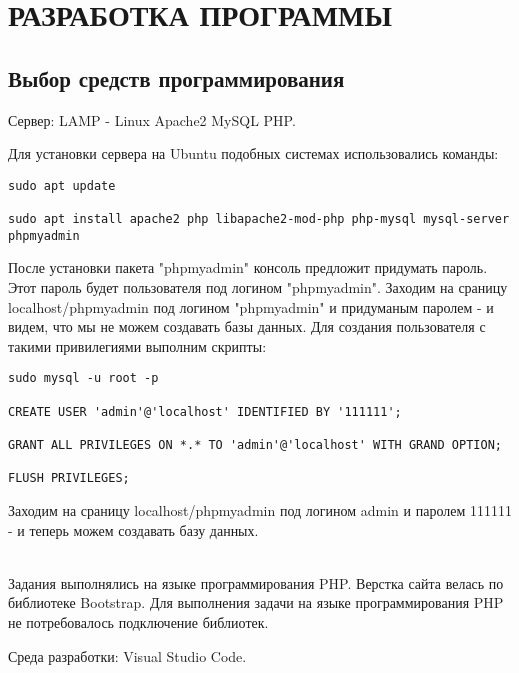 \newpage

\section{РАЗРАБОТКА ПРОГРАММЫ}

\subsection{Выбор средств программирования}

Сервер: LAMP - Linux Apache2 MySQL PHP.

Для установки сервера на Ubuntu подобных системах использовались команды:

\begin{verbatim}
sudo apt update

sudo apt install apache2 php libapache2-mod-php php-mysql mysql-server phpmyadmin
\end{verbatim}

После установки пакета "phpmyadmin" консоль предложит придумать пароль. Этот пароль будет пользователя под логином "phpmyadmin". Заходим на сраницу localhost/phpmyadmin под логином "phpmyadmin" и придуманым паролем - и видем, что мы не можем создавать базы данных. Для создания пользователя с такими привилегиями выполним скрипты:

\begin{verbatim}
sudo mysql -u root -p

CREATE USER 'admin'@'localhost' IDENTIFIED BY '111111';

GRANT ALL PRIVILEGES ON *.* TO 'admin'@'localhost' WITH GRAND OPTION;

FLUSH PRIVILEGES;
\end{verbatim}

Заходим на сраницу localhost/phpmyadmin под логином admin и паролем 111111 - и теперь можем создавать базу данных.

\hspace{0pt}\\

Задания выполнялись на языке программирования PHP. Верстка сайта велась по библиотеке Bootstrap. Для выполнения задачи на языке программирования PHP не потребовалось подключение библиотек. 

\hspace{0pt}

Среда разработки: Visual Studio Code.

\hspace{0pt}\\

